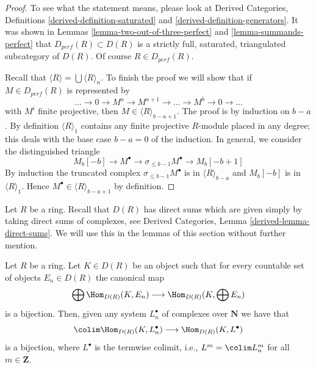 \begin{proof}
To see what the statement means, please look at
Derived Categories, Definitions \ref{derived-definition-saturated} and
\ref{derived-definition-generators}.
It was shown in Lemmas \ref{lemma-two-out-of-three-perfect} and
\ref{lemma-summands-perfect} that $D_{perf}(R) \subset D(R)$
is a strictly full, saturated, triangulated subcategory of $D(R)$.
Of course $R \in D_{perf}(R)$.

\medskip\noindent
Recall that $\langle R \rangle = \bigcup \langle R \rangle_n$.
To finish the proof we will show that if $M \in D_{perf}(R)$
is represented by
$$
\ldots \to 0 \to M^a \to M^{a + 1} \to \ldots \to M^b \to 0 \to \ldots
$$
with $M^i$ finite projective, then $M \in \langle R \rangle_{b - a + 1}$.
The proof is by induction on $b - a$.
By definition $\langle R \rangle_1$ contains any finite projective
$R$-module placed in any degree; this deals with the base case
$b - a = 0$ of the induction. In general, we consider the distinguished
triangle
$$
M_b[-b] \to M^\bullet \to \sigma_{\leq b - 1}M^\bullet \to M_b[-b + 1]
$$
By induction the truncated complex $\sigma_{\leq b - 1}M^\bullet$ is
in $\langle R \rangle_{b - a}$ and $M_b[-b]$ is in $\langle R \rangle_1$.
Hence $M^\bullet \in \langle R \rangle_{b - a + 1}$ by definition.
\end{proof}

\noindent
Let $R$ be a ring. Recall that $D(R)$ has direct sums which are given
simply by taking direct sums of complexes, see
Derived Categories, Lemma \ref{derived-lemma-direct-sums}.
We will use this in the lemmas of this section without further mention. 

\begin{lemma}
\label{lemma-commutes-with-countable-sums}
Let $R$ be a ring. Let $K \in D(R)$ be an object such that for every
countable set of objects $E_n \in D(R)$ the canonical map
$$
\bigoplus \Hom_{D(R)}(K, E_n) \longrightarrow \Hom_{D(R)}(K, \bigoplus E_n)
$$
is a bijection. Then, given any system $L_n^\bullet$ of complexes over
$\mathbf{N}$ we have that
$$
\colim \Hom_{D(R)}(K, L^\bullet_n) \longrightarrow \Hom_{D(R)}(K, L^\bullet)
$$
is a bijection, where $L^\bullet$ is the termwise colimit, i.e.,
$L^m = \colim L_n^m$ for all $m \in \mathbf{Z}$.
\end{lemma}

